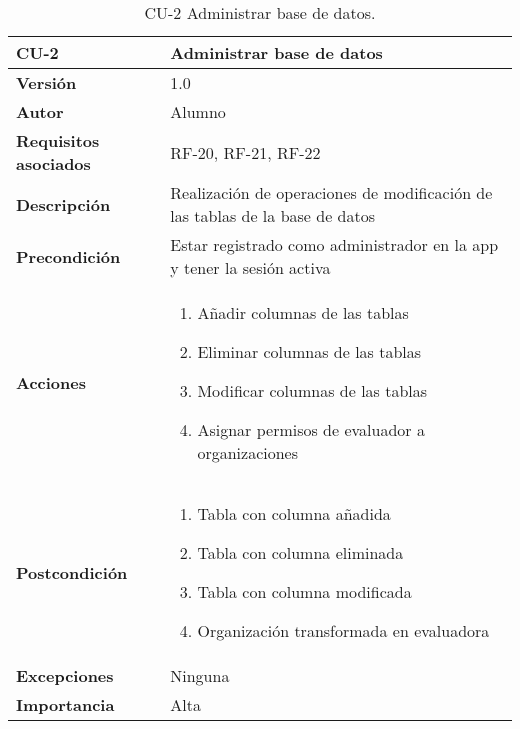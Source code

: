 \begin{table}[p]
	\centering
	\begin{tabularx}{\linewidth}{ p{} p{} }
		\toprule
		\textbf{CU-2}    & \textbf{Administrar base de datos}\\
		\toprule
		\textbf{Versión}              & 1.0    \\
		\textbf{Autor}                & Alumno \\
		\textbf{Requisitos asociados} & RF-20, RF-21, RF-22 \\
		\textbf{Descripción}          & Realización de operaciones de modificación de las tablas de la base de datos \\
		\textbf{Precondición}         & Estar registrado como administrador en la app y tener la sesión activa \\
		\textbf{Acciones}             &
		\begin{enumerate}
			\def\labelenumi{\arabic{enumi}.}
			\tightlist
			\item Añadir columnas de las tablas
			\item Eliminar columnas de las tablas
			\item Modificar columnas de las tablas
			\item Asignar permisos de evaluador a organizaciones
		\end{enumerate}\\
		\textbf{Postcondición}        & 
		\begin{enumerate}
			\def\labelenumi{\arabic{enumi}.}
			\tightlist
			\item Tabla con columna añadida
			\item Tabla con columna eliminada
			\item Tabla con columna modificada
			\item Organización transformada en evaluadora
		\end{enumerate}\\
		\textbf{Excepciones}          & Ninguna \\
		\textbf{Importancia}          & Alta \\
		\bottomrule
	\end{tabularx}
	\caption{CU-2 Administrar base de datos.}
\end{table}

